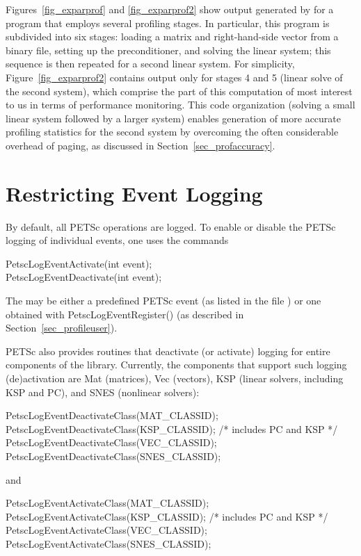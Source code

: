 {{Figures~\ref{fig_exparprof} and \ref{fig_exparprof2} show output
generated by  for a program that employs
several profiling stages.  In particular, this program is
subdivided into six stages: loading a matrix and right-hand-side
vector from a binary file, setting up the preconditioner, and solving
the linear system; this sequence is then repeated for a second linear
system.  For simplicity, Figure~\ref{fig_exparprof2} contains output
only for stages 4 and 5 (linear solve of the second system), which comprise
the part of this computation of most interest to us in terms of
performance monitoring.  This code organization (solving a small
linear system followed by a larger system) enables generation of more
accurate profiling statistics for the second system by overcoming the
often considerable overhead of paging, as discussed in
Section~\ref{sec_profaccuracy}.

\section{Restricting Event Logging}
\label{sec_deactivate}

By default, all PETSc operations are logged.
To enable or disable the PETSc logging of individual events, one uses the commands
\begin{tabbing}
   PetscLogEventActivate(int event);\\
   PetscLogEventDeactivate(int event);
\end{tabbing}
The  may be either a predefined PETSc event (as listed in
the file ) or one obtained with
PetscLogEventRegister() (as described in Section~\ref{sec_profileuser}).

PETSc also provides routines that deactivate (or activate)
logging for entire components of the library. Currently, the 
components that support such logging (de)activation are Mat (matrices),
Vec (vectors), KSP (linear solvers, including KSP 
and PC), and SNES (nonlinear solvers):
\begin{tabbing}
   PetscLogEventDeactivateClass(MAT\_CLASSID);\\
   PetscLogEventDeactivateClass(KSP\_CLASSID); /* includes PC and KSP */\\
   PetscLogEventDeactivateClass(VEC\_CLASSID);\\
   PetscLogEventDeactivateClass(SNES\_CLASSID);
\end{tabbing}
and 
\begin{tabbing}
   PetscLogEventActivateClass(MAT\_CLASSID);\\
   PetscLogEventActivateClass(KSP\_CLASSID);   /* includes PC and KSP */\\
   PetscLogEventActivateClass(VEC\_CLASSID);\\
   PetscLogEventActivateClass(SNES\_CLASSID);
\end{tabbing}

}}
